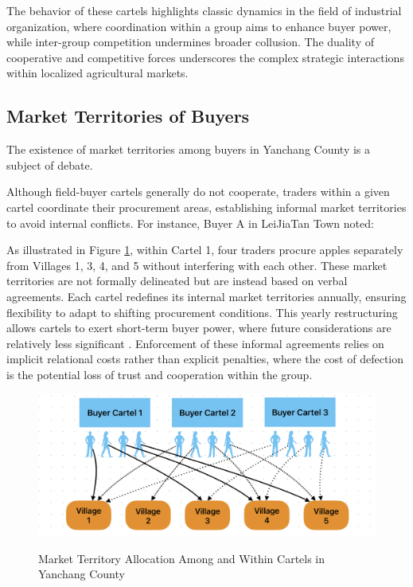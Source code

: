 The behavior of these cartels highlights classic dynamics in the field of industrial organization, where coordination within a group aims to enhance buyer power, while inter-group competition undermines broader collusion. The duality of cooperative and competitive forces underscores the complex strategic interactions within localized agricultural markets.



\subsection{Market Territories of Buyers}
The existence of market territories among buyers in Yanchang County is a subject of debate.

Although field-buyer cartels generally do not cooperate, traders within a given cartel coordinate their procurement areas, establishing informal market territories to avoid internal conflicts. For instance, Buyer A in LeiJiaTan Town noted: 

\begin{quote}
\end{quote}

As illustrated in Figure \ref{fig: Market Territory}, within Cartel 1, four traders procure apples separately from Villages 1, 3, 4, and 5 without interfering with each other. These market territories are not formally delineated but are instead based on verbal agreements. Each cartel redefines its internal market territories annually, ensuring flexibility to adapt to shifting procurement conditions. This yearly restructuring allows cartels to exert short-term buyer power, where future considerations are relatively less significant \citep{sexton2013market}. Enforcement of these informal agreements relies on implicit relational costs rather than explicit penalties, where the cost of defection is the potential loss of trust and cooperation within the group.

\begin{figure}[hpt]
    \centering
        \caption{Market Territory Allocation Among and Within Cartels in Yanchang County}
    \includegraphics[width=\linewidth]{figures/Market_Territory.png}
    \label{fig: Market Territory}
\end{figure}

